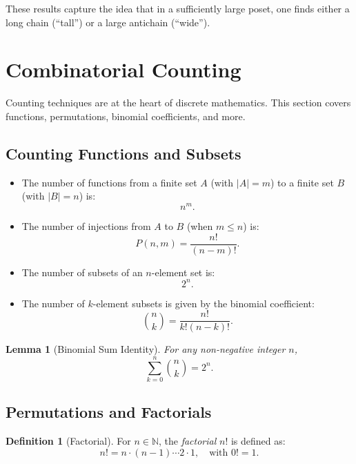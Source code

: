 \documentclass[12pt]{article}
\newtheorem{lemma}[theorem]{Lemma}
\theoremstyle{definition}
\newtheorem{definition}[theorem]{Definition}
\begin{document}
These results capture the idea that in a sufficiently large poset, one finds either a long chain (``tall'') or a large antichain (``wide'').

\section{Combinatorial Counting}

Counting techniques are at the heart of discrete mathematics. This section covers functions, permutations, binomial coefficients, and more.

\subsection{Counting Functions and Subsets}

\begin{itemize}
  \item The number of functions from a finite set \(A\) (with \(|A| = m\)) to a finite set \(B\) (with \(|B| = n\)) is:
  \[
  n^m.
  \]
  \item The number of injections from \(A\) to \(B\) (when \(m \le n\)) is:
  \[
  P(n, m) = \frac{n!}{(n-m)!}.
  \]
  \item The number of subsets of an \(n\)-element set is:
  \[
  2^n.
  \]
  \item The number of \(k\)-element subsets is given by the binomial coefficient:
  \[
  \binom{n}{k} = \frac{n!}{k!(n-k)!}.
  \]
\end{itemize}

\begin{lemma}[Binomial Sum Identity]
  For any non-negative integer \(n\),
  \[
  \sum_{k=0}^{n} \binom{n}{k} = 2^n.
  \]
\end{lemma}

\subsection{Permutations and Factorials}

\begin{definition}[Factorial]
  For \(n \in \mathbb{N}\), the \emph{factorial} \(n!\) is defined as:
  \[
  n! = n \cdot (n-1) \cdots 2 \cdot 1, \quad \text{with } 0! = 1.
  \]
\end{definition}
\end{document}
